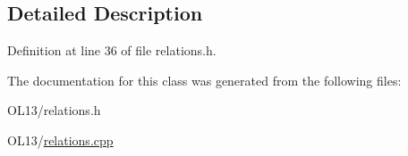 \subsection{Detailed Description}


Definition at line 36 of file relations.\+h.



The documentation for this class was generated from the following files\+:\begin{DoxyCompactItemize}
\item 
O\+L13/relations.\+h\item 
O\+L13/\hyperlink{relations_8cpp}{relations.\+cpp}\end{DoxyCompactItemize}
